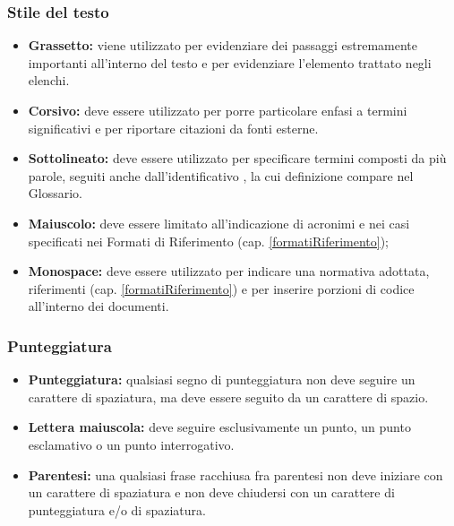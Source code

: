 {{		\subsubsection{Stile del testo} {
			\begin{itemize}
				\item \textbf{Grassetto:} viene utilizzato per evidenziare dei passaggi estremamente importanti all'interno del testo e per evidenziare l'elemento trattato negli elenchi.
				\item \textbf{Corsivo:} deve essere utilizzato per porre particolare enfasi a termini significativi e per riportare citazioni da fonti esterne.
				\item \textbf{Sottolineato:} deve essere utilizzato per specificare termini composti da più parole, seguiti anche dall'identificativo \g, la cui definizione compare nel Glossario.
				\item \textbf{Maiuscolo:} deve essere limitato all'indicazione di acronimi e nei casi specificati nei Formati di Riferimento (cap. \ref{formatiRiferimento});
				\item \textbf{Monospace:} deve essere utilizzato per indicare una normativa adottata, riferimenti (cap. \ref{formatiRiferimento}) e per inserire porzioni di codice all'interno dei documenti.
			\end{itemize}
		}
		\subsubsection{Punteggiatura}{
			\begin{itemize}
				\item \textbf{Punteggiatura:} qualsiasi segno di punteggiatura non deve seguire un carattere di spaziatura, ma deve essere seguito da un carattere di spazio.
				\item \textbf{Lettera maiuscola:} deve seguire esclusivamente un punto, un punto esclamativo o un punto interrogativo.
				\item \textbf{Parentesi:} una qualsiasi frase racchiusa fra parentesi non deve iniziare con un carattere di spaziatura e non deve chiudersi con un carattere di punteggiatura e/o di spaziatura.
			\end{itemize}
		}
}}
